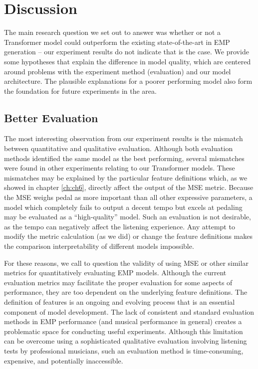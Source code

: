 \chapter{Discussion} \label{ch:ch7}
The main research question we set out to answer was whether or not a Transformer model could outperform the existing state-of-the-art in EMP generation -- our experiment results do not indicate that is the case. We provide some hypotheses that explain the difference in model quality, which are centered around problems with the experiment method (evaluation) and our model architecture. The plausible explanations for a poorer performing model also form the foundation for future experiments in the area.

\section{Better Evaluation}
The most interesting observation from our experiment results is the mismatch between quantitative and qualitative evaluation. Although both evaluation methods identified the same model as the best performing, several mismatches were found in other experiments relating to our Transformer models. These mismatches may be explained by the particular \vnetf{} feature definitions which, as we showed in chapter \ref{ch:ch6}, directly affect the output of the MSE metric. Because the \vnetf{} MSE weighs pedal as more important than all other expressive parameters, a model which completely fails to output a decent tempo but excels at pedaling may be evaluated as a ``high-quality'' model. Such an evaluation is not desirable, as the tempo can negatively affect the listening experience. Any attempt to modify the metric calculation (as we did) or change the feature definitions makes the comparison interpretability of different models impossible. 

For these reasons, we call to question the validity of using MSE or other similar metrics for quantitatively evaluating EMP models. Although the current evaluation metrics may facilitate the proper evaluation for some aspects of performance, they are too dependent on the underlying feature definitions. The definition of features is an ongoing and evolving process that is an essential component of model development. The lack of consistent and standard evaluation methods in EMP performance (and musical performance in general) creates a problematic space for conducting useful experiments. Although this limitation can be overcome using a sophisticated qualitative evaluation involving listening tests by professional musicians, such an evaluation method is time-consuming, expensive, and potentially inaccessible. 

